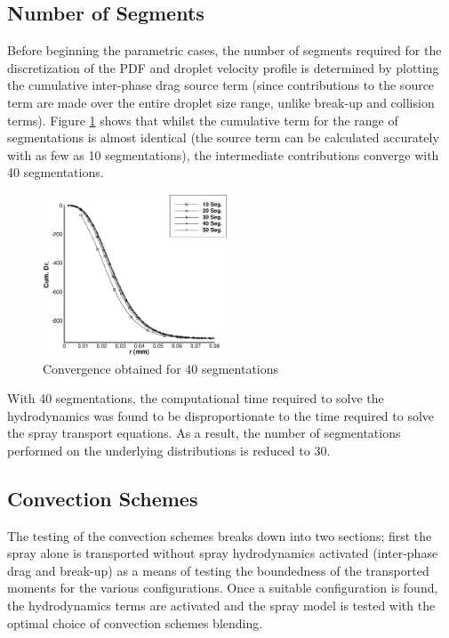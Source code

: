 \documentclass[a4paper,10pt]{article}
\begin{document}
\subsection{Number of Segments}
Before beginning the parametric cases, the number of segments required for the discretization of the PDF and droplet velocity profile is determined by plotting the cumulative inter-phase drag source term (since contributions to the source term are made over the entire droplet size range, unlike break-up and collision terms). Figure \ref{fig:n_seg} shows that whilst the cumulative term for the range of segmentations is almost identical (the source term can be calculated accurately with as few as 10 segmentations), the intermediate contributions converge with 40 segmentations.
\begin{figure}[H]
\centering
\label{fig:n_seg}\includegraphics[width=0.49\textwidth]{n_seg.eps}
\caption{Convergence obtained for 40 segmentations}
\end{figure}
With 40 segmentations, the computational time required to solve the hydrodynamics was found to be disproportionate to the time required to solve the spray transport equations. As a result, the number of segmentations performed on the underlying distributions is reduced to 30.



\subsection{Convection Schemes} %
The testing of the convection schemes breaks down into two sections; first the spray alone is transported without spray hydrodynamics  activated (inter-phase drag and break-up) as a means of testing the boundedness of the transported moments for the various configurations. Once a suitable configuration is found, the hydrodynamics terms are activated and the spray model is tested with the optimal choice of convection schemes blending.
\end{document}
